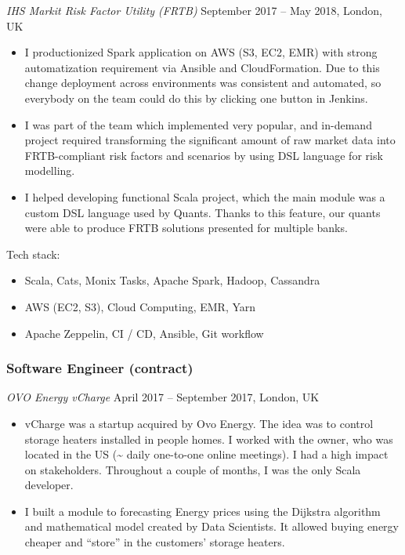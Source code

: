 \documentclass[
]{rss}
\providecommand{\tightlist}{%
  \setlength{\itemsep}{0pt}\setlength{\parskip}{0pt}}
\begin{document}
\begin{resume}
\emph{IHS Markit \textbar{} Risk Factor Utility (FRTB)} September 2017
-- May 2018, London, UK

\begin{itemize}
\item
  I productionized Spark application on AWS (S3, EC2, EMR) with strong
  automatization requirement via Ansible and CloudFormation. Due to this
  change deployment across environments was consistent and automated, so
  everybody on the team could do this by clicking one button in Jenkins.
\item
  I was part of the team which implemented very popular, and in-demand
  project required transforming the significant amount of raw market
  data into FRTB-compliant risk factors and scenarios by using DSL
  language for risk modelling.
\item
  I helped developing functional Scala project, which the main module
  was a custom DSL language used by Quants. Thanks to this feature, our
  quants were able to produce FRTB solutions presented for multiple
  banks.
\end{itemize}

Tech stack:

\begin{itemize}
\tightlist
\item
  Scala, Cats, Monix Tasks, Apache Spark, Hadoop, Cassandra
\item
  AWS (EC2, S3), Cloud Computing, EMR, Yarn
\item
  Apache Zeppelin, CI / CD, Ansible, Git workflow
\end{itemize}

\hypertarget{software-engineer-contract}{%
\subsubsection{Software Engineer
(contract)}\label{software-engineer-contract}}

\emph{OVO Energy \textbar{} vCharge} April 2017 -- September 2017,
London, UK

\begin{itemize}
\item
  vCharge was a startup acquired by Ovo Energy. The idea was to control
  storage heaters installed in people homes. I worked with the owner,
  who was located in the US (\textasciitilde{} daily one-to-one online
  meetings). I had a high impact on stakeholders. Throughout a couple of
  months, I was the only Scala developer.
\item
  I built a module to forecasting Energy prices using the Dijkstra
  algorithm and mathematical model created by Data Scientists. It
  allowed buying energy cheaper and ``store'' in the customers' storage
  heaters.
\end{itemize}


\end{resume}
\end{document}
